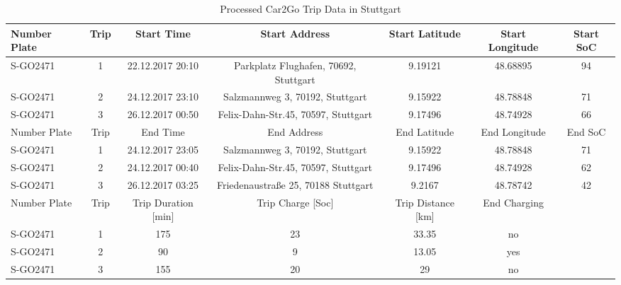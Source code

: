 \begin{sidewaystable}[htbp]
    \caption{Processed Car2Go Trip Data in Stuttgart \label{data-car2go-processed}}
    \centering
    \begin{tabular}{lc|ccccc}
      \hline
      \hline
      Number Plate & Trip & Start Time & Start Address & Start Latitude & Start Longitude & Start SoC\\
      \hline
      S-GO2471 & 1 & 22.12.2017 20:10 & Parkplatz Flughafen, 70692, Stuttgart & 9.19121 & 48.68895 & 94\\
      S-GO2471 & 2 & 24.12.2017 23:10 & Salzmannweg 3, 70192, Stuttgart & 9.15922 & 48.78848 & 71\\
      S-GO2471 & 3 & 26.12.2017 00:50 & Felix-Dahn-Str.45, 70597, Stuttgart & 9.17496 & 48.74928 & 66\\
      \hline
      Number Plate & Trip & End Time & End Address & End Latitude & End Longitude & End SoC\\
      \hline
      S-GO2471 & 1 & 24.12.2017 23:05 & Salzmannweg 3, 70192, Stuttgart & 9.15922 & 48.78848 & 71\\
      S-GO2471 & 2 & 24.12.2017 00:40 & Felix-Dahn-Str.45, 70597, Stuttgart & 9.17496 & 48.74928 & 62\\
      S-GO2471 & 3 & 26.12.2017 03:25 & Friedenaustraße 25, 70188 Stuttgart & 9.2167 & 48.78742 & 42\\
      \hline
      Number Plate & Trip & Trip Duration [min] & Trip Charge [Soc] & Trip Distance [km] & End Charging & \\
      \hline
      S-GO2471 & 1 & 175 & 23 & 33.35 & no & \\
      S-GO2471 & 2 & 90 & 9 & 13.05 & yes & \\
      S-GO2471 & 3 & 155 & 20 & 29 & no & \\
      \hline
      \hline
\end{tabular}
\end{sidewaystable}

